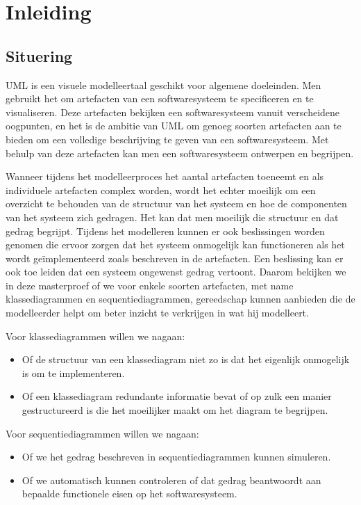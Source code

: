 \chapter{Inleiding}

\section{Situering}\label{sec:situering}

UML\cite{RumbaughJames2005Tuml} is een visuele modelleertaal geschikt voor algemene doeleinden. Men gebruikt het om artefacten van een softwaresysteem te specificeren en te visualiseren. Deze artefacten bekijken een softwaresysteem vanuit verscheidene oogpunten, en het is de ambitie van UML om genoeg soorten artefacten aan te bieden om een volledige beschrijving te geven van een softwaresysteem. Met behulp van deze artefacten kan men een softwaresysteem ontwerpen en begrijpen.

Wanneer tijdens het modelleerproces het aantal artefacten toeneemt en als individuele artefacten complex worden, wordt het echter moeilijk om een overzicht te behouden van de structuur van het systeem en hoe de componenten van het systeem zich gedragen. Het kan dat men moeilijk die structuur en dat gedrag begrijpt. Tijdens het modelleren kunnen er ook beslissingen worden genomen die ervoor zorgen dat het systeem onmogelijk kan functioneren als het wordt ge\"implementeerd zoals beschreven in de artefacten. Een beslissing kan er ook toe leiden dat een systeem ongewenst gedrag vertoont. Daarom bekijken we in deze masterproef of we voor enkele soorten artefacten, met name klassediagrammen en sequentiediagrammen, gereedschap kunnen aanbieden die de modelleerder helpt om beter inzicht te verkrijgen in wat hij modelleert.

Voor klassediagrammen willen we nagaan:

\begin{itemize}
	\item Of de structuur van een klassediagram niet zo is dat het eigenlijk onmogelijk is om te implementeren.
	\item Of een klassediagram redundante informatie bevat of op zulk een manier gestructureerd is die het moeilijker maakt om het diagram te begrijpen.
\end{itemize}

Voor sequentiediagrammen willen we nagaan:

\begin{itemize}
	\item Of we het gedrag beschreven in sequentiediagrammen kunnen simuleren.
	\item Of we automatisch kunnen controleren of dat gedrag beantwoordt aan bepaalde functionele eisen op het softwaresysteem.
\end{itemize} 

